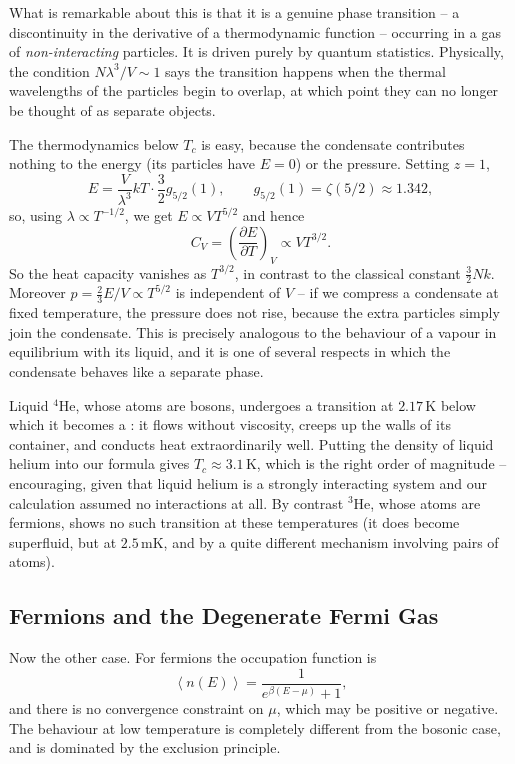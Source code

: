 \documentclass[a4paper]{scrartcl}
\newcommand{\avg}[1]{\left\langle #1 \right\rangle}
\begin{document}
What is remarkable about this is that it is a genuine phase transition -- a discontinuity in the derivative of a thermodynamic function -- occurring in a gas of \emph{non-interacting} particles. It is driven purely by quantum statistics. Physically, the condition $N\lambda^3/V \sim 1$ says the transition happens when the thermal wavelengths of the particles begin to overlap, at which point they can no longer be thought of as separate objects.

The thermodynamics below $T_c$ is easy, because the condensate contributes nothing to the energy (its particles have $E = 0$) or the pressure. Setting $z = 1$,
$$
E = \frac{V}{\lambda^3}kT\cdot \frac 32 g_{5/2}(1), \qquad g_{5/2}(1) = \zeta(5/2)\approx 1.342,
$$
so, using $\lambda \propto T^{-1/2}$, we get $E \propto V T^{5/2}$ and hence
$$
C_V = \left(\frac{\partial E}{\partial T}\right)_V \propto V T^{3/2}.
$$
So the heat capacity vanishes as $T^{3/2}$, in contrast to the classical constant $\tfrac 32 Nk$. Moreover $p = \tfrac 23 E/V \propto T^{5/2}$ is independent of $V$ -- if we compress a condensate at fixed temperature, the pressure does not rise, because the extra particles simply join the condensate. This is precisely analogous to the behaviour of a vapour in equilibrium with its liquid, and it is one of several respects in which the condensate behaves like a separate phase.

\begin{example}
	Liquid ${}^4$He, whose atoms are bosons, undergoes a transition at $2.17\,\mathrm{K}$ below which it becomes a : it flows without viscosity, creeps up the walls of its container, and conducts heat extraordinarily well. Putting the density of liquid helium into our formula gives $T_c \approx 3.1\,\mathrm{K}$, which is the right order of magnitude -- encouraging, given that liquid helium is a strongly interacting system and our calculation assumed no interactions at all. By contrast ${}^3$He, whose atoms are fermions, shows no such transition at these temperatures (it does become superfluid, but at $2.5\,\mathrm{mK}$, and by a quite different mechanism involving pairs of atoms).
\end{example}

\subsection{Fermions and the Degenerate Fermi Gas}\label{sec:fermi}

Now the other case. For fermions the occupation function is
$$
\avg{n(E)} = \frac{1}{e^{\beta(E-\mu)}+1},
$$
and there is no convergence constraint on $\mu$, which may be positive or negative. The behaviour at low temperature is completely different from the bosonic case, and is dominated by the exclusion principle.
\end{document}
